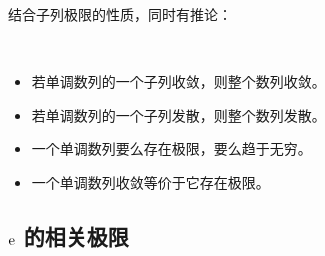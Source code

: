 结合子列极限的性质，同时有推论：

\begin{corollary}
	\ 
	\begin{itemize}
		\item 若单调数列的一个子列收敛，则整个数列收敛。
		\item 若单调数列的一个子列发散，则整个数列发散。
		\item 一个单调数列要么存在极限，要么趋于无穷。
		\item 一个单调数列收敛等价于它存在极限。
	\end{itemize}
\end{corollary}

\subsection{$\mathrm{e}$ 的相关极限}

